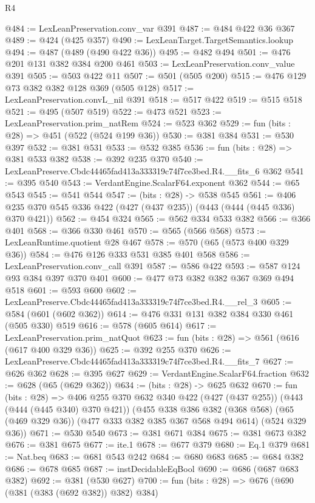 \begin{lexlean}{R4}
\begin{coremodule}
@484 := LexLeanPreservation.conv_var @391
@487 := @484 @422 @36 @367
@489 := @424 (@425 @357)
@490 := LexLeanTarget.TargetSemantics.lookup
@494 := @487 (@489 (@490 @422 @36))
@495 := @482 @494
@501 := @476 @201 @131 @382 @384 @200 @461
@503 := LexLeanPreservation.conv_value @391
@505 := @503 @422 @11
@507 := @501 (@505 @200)
@515 := @476 @129 @73 @382 @382 @128 @369 (@505 @128)
@517 := LexLeanPreservation.convL_nil @391
@518 := @517 @422
@519 := @515 @518
@521 := @495 (@507 @519)
@522 := @473 @521
@523 := LexLeanPreservation.prim_natRem
@524 := @523 @362
@529 := fun (bits : @28) => @451 (@522 (@524 @199 @36))
@530 := @381 @384
@531 := @530 @397
@532 := @381 @531
@533 := @532 @385
@536 := fun (bits : @28) => @381 @533 @382
@538 := @392 @235 @370
@540 := LexLeanPreserve.Cbdc44465fad413a333319c74f7ce3bed.R4.__fits_6 @362
@541 := @395 @540
@543 := VerdantEngine.ScalarF64.exponent @362
@544 := @65 @543
@545 := @541 @544
@547 := (bits : @28) -> @538 @545
@561 := @406 @235 @370 @545 @336 @422 (@427 (@437 @235)) (@443 (@444 (@445 @336) @370 @421))
@562 := @454 @324
@565 := @562 @334 @533 @382
@566 := @366 @401
@568 := @366 @330 @461
@570 := @565 (@566 @568)
@573 := LexLeanRuntime.quotient @28 @467
@578 := @570 (@65 (@573 @400 @329 @36))
@584 := @476 @126 @333 @531 @385 @401 @568
@586 := LexLeanPreservation.conv_call @391
@587 := @586 @422
@593 := @587 @124 @93 @384 @397 @370 @401
@600 := @477 @73 @382 @382 @367 @369 @494 @518
@601 := @593 @600
@602 := LexLeanPreserve.Cbdc44465fad413a333319c74f7ce3bed.R4.__rel_3
@605 := @584 (@601 (@602 @362))
@614 := @476 @331 @131 @382 @384 @330 @461 (@505 @330) @519
@616 := @578 (@605 @614)
@617 := LexLeanPreservation.prim_natQuot
@623 := fun (bits : @28) => @561 (@616 (@617 @400 @329 @36))
@625 := @392 @255 @370
@626 := LexLeanPreserve.Cbdc44465fad413a333319c74f7ce3bed.R4.__fits_7
@627 := @626 @362
@628 := @395 @627
@629 := VerdantEngine.ScalarF64.fraction
@632 := @628 (@65 (@629 @362))
@634 := (bits : @28) -> @625 @632
@670 := fun (bits : @28) =>
  @406
    @255
    @370
    @632
    @340
    @422
    (@427 (@437 @255))
    (@443 (@444 (@445 @340) @370 @421))
    (@455
      @338
      @386
      @382
      (@368 @568)
      (@65 (@469 @329 @36))
      (@477 @333 @382 @385 @367 @568 @494 @614)
      (@524 @329 @36))
@671 := @530 @540
@673 := @381 @671 @384
@675 := @381 @673 @382
@676 := @381 @675
@677 := ite.{1}
@678 := @677 @379
@680 := Eq.{1} @379
@681 := Nat.beq
@683 := @681 @543 @242
@684 := @680 @683
@685 := @684 @382
@686 := @678 @685
@687 := instDecidableEqBool
@690 := @686 (@687 @683 @382)
@692 := @381 (@530 @627)
@700 := fun (bits : @28) => @676 (@690 (@381 (@383 (@692 @382)) @382) @384)

\end{coremodule}
\end{lexlean}
